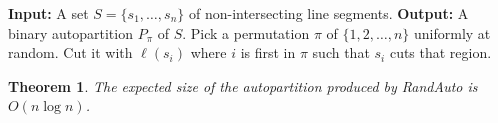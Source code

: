 \documentclass[twoside,12pt]{book}
\theoremstyle{plain}
\newtheorem{theorem}{Theorem}[chapter]
\theoremstyle{definition}
\theoremstyle{remark}
\begin{document}
\begin{algorithm}[htbp]
\caption{RandAuto}
\label{alg:randauto}
\begin{algorithmic}[1]
\State \textbf{Input:} A set $S=\{s_1,\ldots,s_n\}$ of non-intersecting
  line segments.
\State \textbf{Output:} A binary autopartition $P_\pi$ of $S$.
\State Pick a permutation $\pi$ of $\{1,2,\ldots,n\}$ uniformly at random.
  \State Cut it with $\ell(s_i)$ where $i$ is first in $\pi$ such that
    $s_i$ cuts that region.
\EndWhile
\end{algorithmic}
\end{algorithm}

\begin{theorem}
\label{thm:partition}
The expected size of the autopartition produced by RandAuto is $O(n\log n)$.
\end{theorem}
\end{document}
